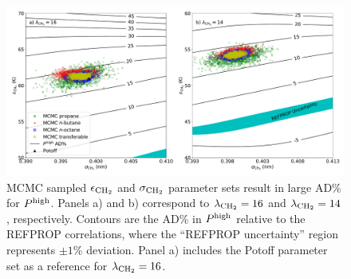 \documentclass[preprint,letterpaper,floatfix,citeautoscript,aip,jcp]{revtex4-1}
\begin{document}

\begin{figure}[htb!]
	\centering
	\includegraphics[width=6.4in]{MCMC_Mie_14_16_propane_butane_octane}
	\caption{MCMC sampled $\epsilon_{\rm CH_2}$ and $\sigma_{\rm CH_2}$ parameter sets result in large AD\% for $P^{\rm high}$. Panels a) and b) correspond to $\lambda_{\rm CH_2} = 16$ and $\lambda_{\rm CH_2} = 14$, respectively. Contours are the AD\% in $P^{\rm high}$ relative to the REFPROP correlations, where the ``REFPROP uncertainty'' region represents $\pm 1$\% deviation. Panel a) includes the Potoff parameter set as a reference for $\lambda_{\rm CH_2} = 16$.}
	\label{fig:MCMC_Mie_14_16_propane_butane_octane}
\end{figure} 

\end{document}
